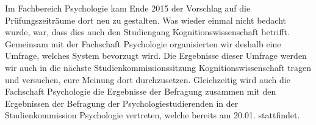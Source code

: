 Im Fachbereich Psychologie kam Ende 2015 der Vorschlag auf die Prüfungszeiträume dort neu zu gestalten. Was wieder einmal nicht bedacht wurde, war, dass dies auch den Studiengang Kognitionswissenschaft betrifft. Gemeinsam mit der Fachschaft Psychologie organisierten wir deshalb eine Umfrage, welches System bevorzugt wird. Die Ergebnisse dieser Umfrage werden wir auch in die nächste Studienkommissionssitzung Kognitionswissenschaft tragen und versuchen, eure Meinung dort durchzusetzen.
Gleichzeitig wird auch die Fachschaft Psychologie die Ergebnisse der Befragung zusammen mit den Ergebnissen der Befragung der Psychologiestudierenden in der Studienkommission Psychologie vertreten, welche bereits am 20.01. stattfindet. 